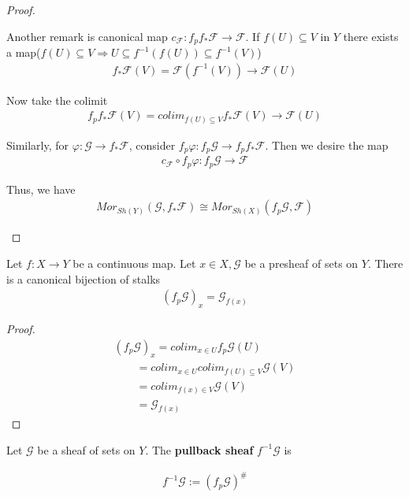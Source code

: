 \documentclass[Total.tex]{subfiles}
\begin{document}
\begin{proof}
\begin{itemize}
						
						Another remark is canonical map $c_\mathcal{F}:f_pf_*\mathcal{F}\rightarrow \mathcal{F}$. If $f(U)\subseteq V$ in $Y$ there exists a map($f(U)\subseteq V\Rightarrow U\subseteq f^{-1}(f(U))\subseteq f^{-1}(V)$)
						\begin{gather*}
							f_*\mathcal{F}(V)=\mathcal{F}(f^{-1}(V))\rightarrow \mathcal{F}(U)
						\end{gather*}
						
						Now take the colimit
						\begin{gather*}
							f_pf_*\mathcal{F}(V)=colim_{f(U)\subseteq V} f_*\mathcal{F}(V)\rightarrow \mathcal{F}(U)
						\end{gather*}
						
						Similarly, for $\varphi:\mathcal{G}\rightarrow f_*\mathcal{F}$, consider $f_p\varphi:f_p\mathcal{G}\rightarrow f_pf_*\mathcal{F}$. Then we desire the map
						\begin{gather*}
							c_\mathcal{F}\circ f_p\varphi:f_p\mathcal{G}\rightarrow \mathcal{F}
						\end{gather*}
						
						Thus, we have
						\begin{gather*}
							Mor_{Sh(Y)}(\mathcal{G},f_*\mathcal{F})\cong Mor_{Sh(X)}(f_p\mathcal{G},\mathcal{F})
						\end{gather*}
					\end{itemize}
				\end{proof}
				
				\begin{lemma}
					Let $f:X\rightarrow Y$ be a continuous map. Let $x\in X,\mathcal{G}$ be a presheaf of sets on $Y$. There is a canonical bijection of stalks
					\begin{gather*}
						(f_p \mathcal{G})_x=\mathcal{G}_{f(x)}
					\end{gather*}
				\end{lemma}
				\begin{proof}
					\begin{gather*}
						(f_p\mathcal{G})_x=colim_{x\in U} f_p \mathcal{G}(U)\\
						\qquad=colim_{x\in U} colim_{f(U)\subseteq V} \mathcal{G}(V)\\
						\qquad=colim_{f(x)\in V} \mathcal{G}(V)\\
						\qquad=\mathcal{G}_{f(x)}
					\end{gather*}
				\end{proof}
				
				\begin{Def}
					Let $\mathcal{G}$ be a sheaf of sets on $Y$. The \textbf{pullback sheaf} $f^{-1}\mathcal{G}$ is  
					
					\begin{gather*}
						f^{-1}\mathcal{G}:=(f_p\mathcal{G})^\#
					\end{gather*}
				\end{Def}
				
\end{document}
